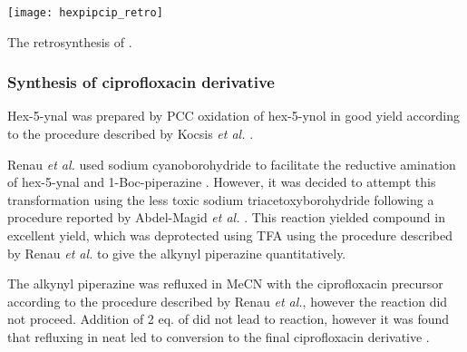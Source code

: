 
\begin{scheme}[H]
	\begin{center}
		\texttt{[image: hexpipcip\_retro]}
		\caption{The retrosynthesis of . \label{sch:hexpipcip_retro}}
	\end{center}
\end{scheme}

\subsubsection{Synthesis of ciprofloxacin derivative }

Hex-5-ynal  was prepared by PCC oxidation of hex-5-ynol  in good yield according to the procedure described by Kocsis \textit{et al.} \cite{Kocsis2012}. 

Renau \textit{et al.}\cite{Renau1996} used sodium cyanoborohydride to facilitate the reductive amination of hex-5-ynal  and 1-Boc-piperazine . However, it was decided to attempt this transformation using the less toxic sodium triacetoxyborohydride following a procedure reported by Abdel-Magid \textit{et al.} \cite{Abdel-Magid1996}. This reaction yielded compound  in excellent yield, which was deprotected using TFA using the procedure described by Renau \textit{et al.}\cite{Renau1996} to give the alkynyl piperazine  quantitatively. 

The alkynyl piperazine  was refluxed in MeCN with the ciprofloxacin precursor  according to the procedure described by Renau \textit{et al.}\cite{Renau1996}, however the reaction did not proceed. Addition of 2 eq. of  did not lead to reaction, however it was found that refluxing in neat  led to conversion to the final ciprofloxacin derivative .

